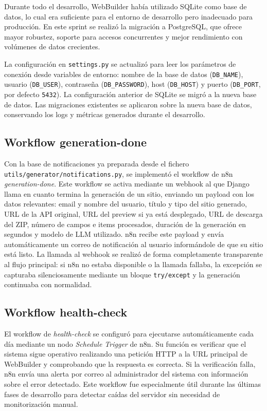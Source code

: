 Durante todo el desarrollo, WebBuilder había utilizado SQLite como base de datos, lo cual era suficiente para el entorno de desarrollo pero inadecuado para producción. En este sprint se realizó la migración a PostgreSQL, que ofrece mayor robustez, soporte para accesos concurrentes y mejor rendimiento con volúmenes de datos crecientes.

La configuración en \texttt{settings.py} se actualizó para leer los parámetros de conexión desde variables de entorno: nombre de la base de datos (\texttt{DB\_NAME}), usuario (\texttt{DB\_USER}), contraseña (\texttt{DB\_PASSWORD}), host (\texttt{DB\_HOST}) y puerto (\texttt{DB\_PORT}, por defecto \texttt{5432}). La configuración anterior de SQLite se migró a la nueva base de datos. Las migraciones existentes se aplicaron sobre la nueva base de datos, conservando los logs y métricas generados durante el desarrollo.

\subsection{Workflow generation-done}
\label{subsec:workflow-generation-done}

Con la base de notificaciones ya preparada desde el fichero \\ \texttt{utils/generator/notifications.py}, se implementó el workflow de n8n \emph{generation-done}. Este workflow se activa mediante un webhook al que Django llama en cuanto termina la generación de un sitio, enviando un payload con los datos relevantes: email y nombre del usuario, título y tipo del sitio generado, URL de la API original, URL del preview si ya está desplegado, URL de descarga del ZIP, número de campos e items procesados, duración de la generación en segundos y modelo de LLM utilizado.
n8n recibe este payload y envía automáticamente un correo de notificación al usuario informándole de que su sitio está listo. La llamada al webhook se realizó de forma completamente transparente al flujo principal: si n8n no estaba disponible o la llamada fallaba, la excepción se capturaba silenciosamente mediante un bloque \texttt{try/except} y la generación continuaba con normalidad.


\subsection{Workflow health-check}
\label{subsec:workflow-health-check}

El workflow de \emph{health-check} se configuró para ejecutarse automáticamente cada día mediante un nodo \emph{Schedule Trigger} de n8n. Su función es verificar que el sistema sigue operativo realizando una petición HTTP a la URL principal de WebBuilder y comprobando que la respuesta es correcta. Si la verificación falla, n8n envía una alerta por correo al administrador del sistema con información sobre el error detectado. Este workflow fue especialmente útil durante las últimas fases de desarrollo para detectar caídas del servidor sin necesidad de monitorización manual.


